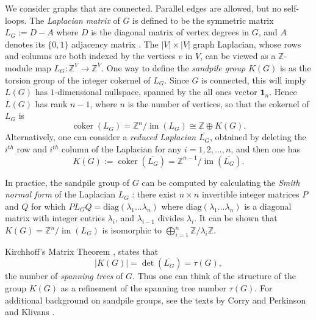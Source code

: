 \documentclass[10pt,reqno]{amsart}
\DeclareMathOperator{\coker}{coker}
\DeclareMathOperator{\im}{im}
\def\onesvector{\mathbf{1}}
\begin{document}
We consider graphs that are connected. Parallel edges are allowed, but no self-loops.  The {\it Laplacian matrix} of $G$ is defined to be the symmetric matrix $L_G := D - A$ where  $D$ is the diagonal matrix of vertex degrees in $G$, and $A$ denotes its $\{0,1\}$ adjacency matrix \cite[Chapter 2]{Klivans}. 
The $|V| \times |V|$  graph Laplacian,  whose rows and columns are both indexed by
the vertices $v$ in $V$, can be viewed as   a $\mathbb{Z}$-module map $L_G: \mathbb{Z}^V \rightarrow \mathbb{Z}^V$. One way to define the {\it sandpile group} $K(G)$ is as the torsion group of the integer cokernel of $L_G$.  Since $G$ is connected, this will imply $L(G)$ has
$1$-dimensional nullspace, spanned by the all ones vector $\onesvector_n$.  Hence
$L(G)$ has rank $n-1$, where $n$ is the number of vertices, so that 
the cokernel of $L_G$ is
\begin{equation*} \label{cokernel} 
\coker( L_G) = \mathbb{Z}^n / \im(L_G) \cong \mathbb{Z} \oplus K(G). 
\end{equation*}
Alternatively, one can consider a {\it reduced Laplacian} $\overline{L_G}$, obtained by deleting the $i^{th}$ row and $i^{th}$ column of the  Laplacian for any $i=1,2,\ldots,n$, 
and then one has
\begin{equation}
    \label{sandpile-group-presentation}
K(G):= \coker (\overline{L_G})= \mathbb{Z}^{n-1} / \im(\overline{L_G}).
\end{equation}



In practice, the sandpile group of $G$ can be computed  by calculating  the {\it Smith normal form} of the Laplacian $L_G$ \cite{LORENZINI20081271}: there exist $n \times n$ invertible integer matrices $P$ and $Q$ for which
$PL_GQ = \mathrm{diag}(\lambda_1...\lambda_n)$
where
$\mathrm{diag}(\lambda_1...\lambda_n)$ is a diagonal matrix with integer entries $\lambda_i$, and $\lambda_{i-1}$ divides $\lambda_{i}.$  It can be shown that  
$K(G)=\mathbb{Z}^n / \im(L_G) $ is isomorphic to  $\bigoplus_{i=1}^{n} \mathbb{Z} / \lambda_i\mathbb{Z}.$  


Kirchhoff's Matrix Theorem  \cite[\S 5.6]{Stanley}, states that 
$$
|K(G)| =  \det (\overline{L_G}) = \tau(G),
$$ 
the number of {\it spanning trees} of $G.$ 
Thus one can think of the structure of the
group $K(G)$ as a refinement of the spanning
tree number $\tau(G)$. For additional background on sandpile groups, see the texts by Corry and Perkinson \cite[Chap. 6]{CorryPerkinson} and Klivans \cite[Chap. 4]{Klivans}.     
\end{document}
